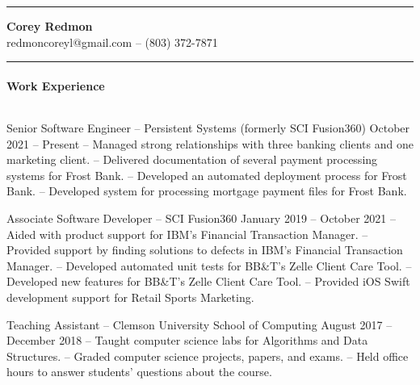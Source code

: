 \documentclass{article}
\begin{document}
  \hrule height 1pt
  \begin{center}
    {\Large \textbf{Corey Redmon}}\\
    redmoncoreyl@gmail.com -- (803) 372-7871
  \end{center}
  \vspace{0.1in}
  \hrule height 1pt

  \setlength{\parskip}{0.0in}
  \setlength{\parindent}{0.4in}

  \paragraph{Work Experience} $ $

  \hangindent=0.8in
  Senior Software Engineer -- Persistent Systems (formerly SCI Fusion360) \hfill October 2021 -- Present \newline
  -- Managed strong relationships with three banking clients and one marketing client. \newline
  -- Delivered documentation of several payment processing systems for Frost Bank. \newline
  -- Developed an automated deployment process for Frost Bank.
  -- Developed system for processing mortgage payment files for Frost Bank.

  \hangindent=0.8in
  Associate Software Developer -- SCI Fusion360 \hfill January 2019 -- October 2021 \newline
  -- Aided with product support for IBM's Financial Transaction Manager. \newline
  -- Provided support by finding solutions to defects in IBM's Financial Transaction Manager. \newline
  -- Developed automated unit tests for BB\&T's Zelle Client Care Tool. \newline
  -- Developed new features for BB\&T's Zelle Client Care Tool. \newline
  -- Provided iOS Swift development support for Retail Sports Marketing.

  \hangindent=0.8in
  Teaching Assistant -- Clemson University School of Computing \hfill August 2017 -- December 2018 \newline
  -- Taught computer science labs for Algorithms and Data Structures. \newline
  -- Graded computer science projects, papers, and exams. \newline
  -- Held office hours to answer students' questions about the course.
\end{document}
